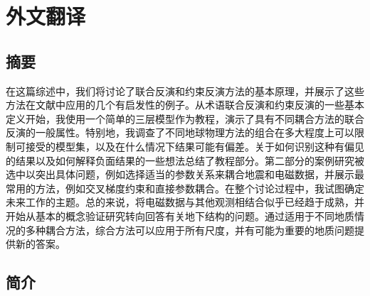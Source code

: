 \cleardoublepage
\newrefsection
\chapter{外文翻译}

\section{摘要}

在这篇综述中，我们将讨论了联合反演和约束反演方法的基本原理，并展示了这些方法在文献中应用的几个有启发性的例子。从术语联合反演和约束反演的一些基本定义开始，我使用一个简单的三层模型作为教程，演示了具有不同耦合方法的联合反演的一般属性。特别地，我调查了不同地球物理方法的组合在多大程度上可以限制可接受的模型集，以及在什么情况下结果可能有偏差。关于如何识别这种有偏见的结果以及如何解释负面结果的一些想法总结了教程部分。第二部分的案例研究被选中以突出具体问题，例如选择适当的参数关系来耦合地震和电磁数据，并展示最常用的方法，例如交叉梯度约束和直接参数耦合。在整个讨论过程中，我试图确定未来工作的主题。总的来说，将电磁数据与其他观测相结合似乎已经趋于成熟，并开始从基本的概念验证研究转向回答有关地下结构的问题。通过适用于不同地质情况的多种耦合方法，综合方法可以应用于所有尺度，并有可能为重要的地质问题提供新的答案。

\section{简介}


